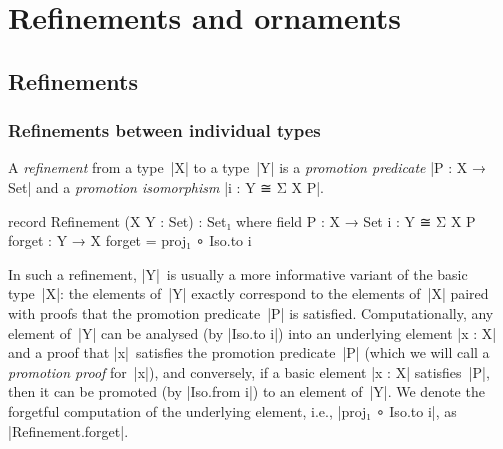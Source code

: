 \chapter{Refinements and ornaments}
\label{chapter:ornaments}



\section{Refinements}

\subsection{Refinements between individual types}

A \emph{refinement} from a type~|X| to a type~|Y| is a \emph{promotion predicate} |P : X → Set| and a \emph{promotion isomorphism} |i : Y ≅ Σ X P|.
\begin{code}
record Refinement (X Y : Set) : Set₁ where
  field
    P  :  X → Set
    i  :  Y ≅ Σ X P
  forget : Y → X
  forget = proj₁ ∘ Iso.to i
\end{code}
In such a refinement, |Y|~is usually a more informative variant of the basic type~|X|: the elements of~|Y| exactly correspond to the elements of~|X| paired with proofs that the promotion predicate~|P| is satisfied.
Computationally, any element of~|Y| can be analysed (by |Iso.to i|\kern1pt) into an underlying element |x : X| and a proof that |x|~satisfies the promotion predicate~|P| (which we will call a \emph{promotion proof} for~|x|), and conversely, if a basic element |x : X| satisfies~|P|, then it can be promoted (by |Iso.from i|\kern1pt) to an element of~|Y|.
We denote the forgetful computation of the underlying element, i.e., |proj₁ ∘ Iso.to i|, as |Refinement.forget|.



